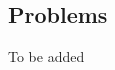 \begin{example}
\begin{itemize}[itemsep=1em]
\end{itemize}
\end{example}

\vspace*{2em}

\subsection{Problems}
\vspace{0.1in}
To be added
%
